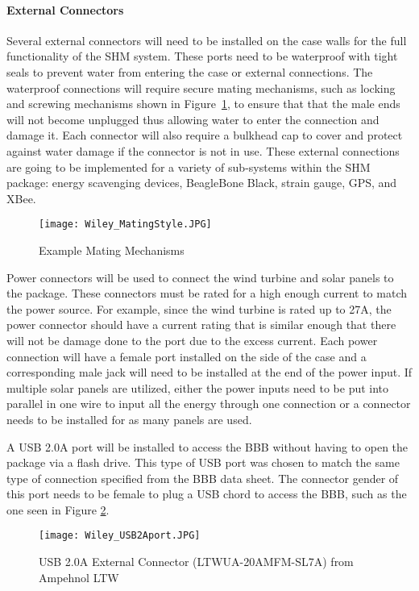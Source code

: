 \paragraph{External Connectors} 
Several external connectors will need to be installed on the case walls for the full functionality of the SHM system.  These ports need to be waterproof
with tight seals to prevent water from entering the case or external connections.  The waterproof connections will require secure mating mechanisms, such
as locking and screwing mechanisms shown in Figure~\ref{fig:BowChicaWowWow}, to ensure that that the male ends will not become unplugged thus allowing
water to enter the connection and damage it.  Each connector will also require a bulkhead cap to cover and protect against water damage if the
connector is not in use.  These external connections are going to be implemented for a variety of sub-systems within the SHM package: energy
scavenging devices, BeagleBone Black, strain gauge, GPS, and XBee.
\begin{figure}[h]
\centering
\texttt{[image: Wiley\_MatingStyle.JPG]}
\caption{\label{fig:BowChicaWowWow} Example Mating Mechanisms}
\end{figure}

Power connectors will be used to connect the wind turbine and solar panels to the package. These connectors must be rated for a high enough current to
match the power source.  For example, since the wind turbine is rated up to 27A, the power connector should have a current rating that is similar enough
that there will not be damage done to the port due to the excess current.  Each power connection will have a female port installed on the side of the
case and a corresponding male jack will need to be installed at the end of the power input.  If multiple solar panels are utilized, either the power
inputs need to be put into parallel in one wire to input all the energy through one connection or a connector needs to be installed for as many panels
are used.  

A USB 2.0A port will be installed to access the BBB without having to open the package via a flash drive.  This type of USB port was chosen to match the
same type of connection specified from the BBB data sheet.  The connector gender of this port needs to be female to plug a USB chord to access the BBB,
such as the one seen in Figure \ref{fig:USB}. 
\begin{figure}[h]
\centering
\texttt{[image: Wiley\_USB2Aport.JPG]}
\caption{\label{fig:USB} USB 2.0A External Connector (LTWUA-20AMFM-SL7A) from Ampehnol LTW}
\end{figure}

